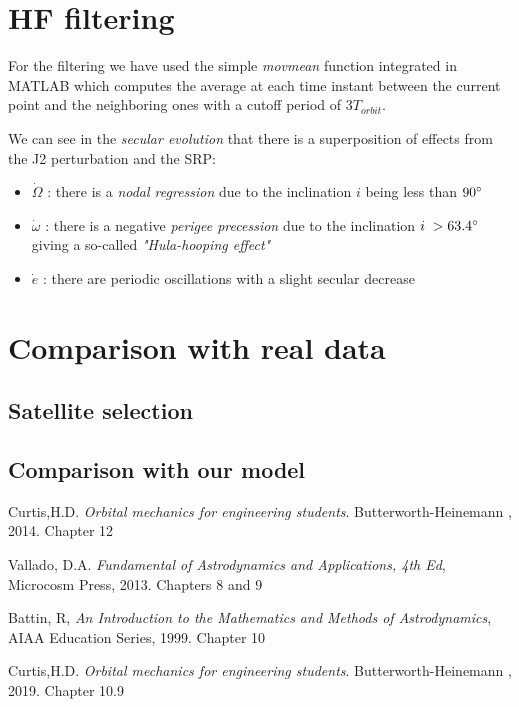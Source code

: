 \documentclass[11pt,a4paper]{report}
\begin{document}
\section{HF filtering}
For the filtering we have used the simple \emph{movmean} function integrated in MATLAB which computes the average at each time instant between the current point and the neighboring ones with a cutoff period of $3T_{orbit}$.
\par We can see in the \emph{secular evolution} that there is a superposition of effects from the J2 perturbation and the SRP:
\begin{itemize}
    \item \emph{$\dot{\Omega}$} : there is a \emph{nodal regression} due to the inclination $i$ being less than $90\degree$
    \item  \emph{$\dot{\omega}$} : there is a negative \emph{perigee precession} due to the inclination $i\;> 63.4\degree$ giving a so-called \emph{"Hula-hooping effect"}
    \item \emph{$\dot{e}$} : there are periodic oscillations with a slight secular decrease
\end{itemize}


\section{Comparison with real data}

\subsection{Satellite selection}

\subsection{Comparison with our model}

\begin{thebibliography}{9}
Curtis,H.D. 
\textit{Orbital mechanics for engineering students}. 
Butterworth-Heinemann , 2014. Chapter 12

Vallado, D.A.
\textit{Fundamental of Astrodynamics and Applications, 4th
Ed}, Microcosm Press, 2013. Chapters 8 and 9

Battin, R,
\textit{An Introduction to the Mathematics and Methods of
Astrodynamics}, AIAA Education Series, 1999. Chapter 10

Curtis,H.D. 
\textit{Orbital mechanics for engineering students}. 
Butterworth-Heinemann , 2019. Chapter 10.9

\end{thebibliography}
\end{document}
